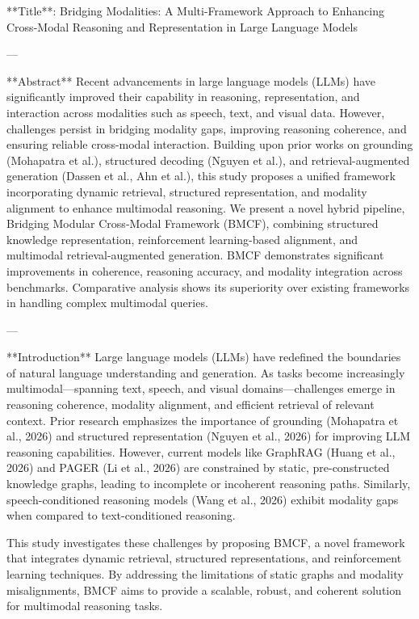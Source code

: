 **Title**: Bridging Modalities: A Multi-Framework Approach to Enhancing Cross-Modal Reasoning and Representation in Large Language Models  

---

**Abstract**  
Recent advancements in large language models (LLMs) have significantly improved their capability in reasoning, representation, and interaction across modalities such as speech, text, and visual data. However, challenges persist in bridging modality gaps, improving reasoning coherence, and ensuring reliable cross-modal interaction. Building upon prior works on grounding (Mohapatra et al.), structured decoding (Nguyen et al.), and retrieval-augmented generation (Dassen et al., Ahn et al.), this study proposes a unified framework incorporating dynamic retrieval, structured representation, and modality alignment to enhance multimodal reasoning. We present a novel hybrid pipeline, Bridging Modular Cross-Modal Framework (BMCF), combining structured knowledge representation, reinforcement learning-based alignment, and multimodal retrieval-augmented generation. BMCF demonstrates significant improvements in coherence, reasoning accuracy, and modality integration across benchmarks. Comparative analysis shows its superiority over existing frameworks in handling complex multimodal queries.  

---

**Introduction**  
Large language models (LLMs) have redefined the boundaries of natural language understanding and generation. As tasks become increasingly multimodal—spanning text, speech, and visual domains—challenges emerge in reasoning coherence, modality alignment, and efficient retrieval of relevant context. Prior research emphasizes the importance of grounding (Mohapatra et al., 2026) and structured representation (Nguyen et al., 2026) for improving LLM reasoning capabilities. However, current models like GraphRAG (Huang et al., 2026) and PAGER (Li et al., 2026) are constrained by static, pre-constructed knowledge graphs, leading to incomplete or incoherent reasoning paths. Similarly, speech-conditioned reasoning models (Wang et al., 2026) exhibit modality gaps when compared to text-conditioned reasoning.  

This study investigates these challenges by proposing BMCF, a novel framework that integrates dynamic retrieval, structured representations, and reinforcement learning techniques. By addressing the limitations of static graphs and modality misalignments, BMCF aims to provide a scalable, robust, and coherent solution for multimodal reasoning tasks.  

